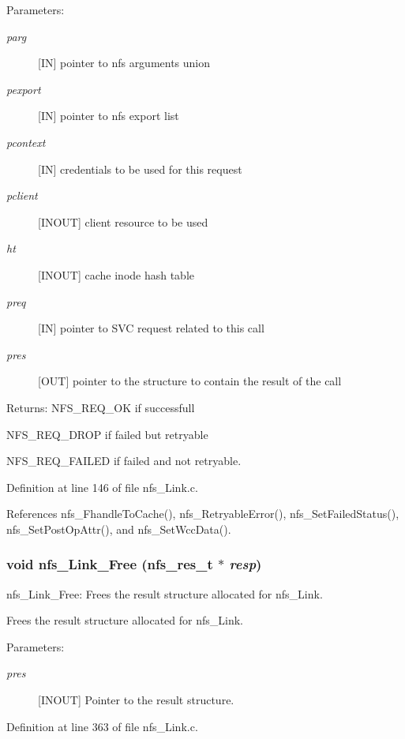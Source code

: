 \begin{Desc}
\item[Parameters:]
\begin{description}
\item[{\em parg}][IN] pointer to nfs arguments union \item[{\em pexport}][IN] pointer to nfs export list \item[{\em pcontext}][IN] credentials to be used for this request \item[{\em pclient}][INOUT] client resource to be used \item[{\em ht}][INOUT] cache inode hash table \item[{\em preq}][IN] pointer to SVC request related to this call \item[{\em pres}][OUT] pointer to the structure to contain the result of the call\end{description}
\end{Desc}
\begin{Desc}
\item[Returns:]NFS\_\-REQ\_\-OK if successfull \par
 NFS\_\-REQ\_\-DROP if failed but retryable \par
 NFS\_\-REQ\_\-FAILED if failed and not retryable. \end{Desc}


Definition at line 146 of file nfs\_\-Link.c.

References nfs\_\-Fhandle\-To\-Cache(), nfs\_\-Retryable\-Error(), nfs\_\-Set\-Failed\-Status(), nfs\_\-Set\-Post\-Op\-Attr(), and nfs\_\-Set\-Wcc\-Data().
\subsubsection{\setlength{\rightskip}{0pt plus 5cm}void nfs\_\-Link\_\-Free (nfs\_\-res\_\-t $\ast$ {\em resp})}\label{nfs__Link_8c_a1}


nfs\_\-Link\_\-Free: Frees the result structure allocated for nfs\_\-Link.

Frees the result structure allocated for nfs\_\-Link.

\begin{Desc}
\item[Parameters:]
\begin{description}
\item[{\em pres}][INOUT] Pointer to the result structure. \end{description}
\end{Desc}


Definition at line 363 of file nfs\_\-Link.c.